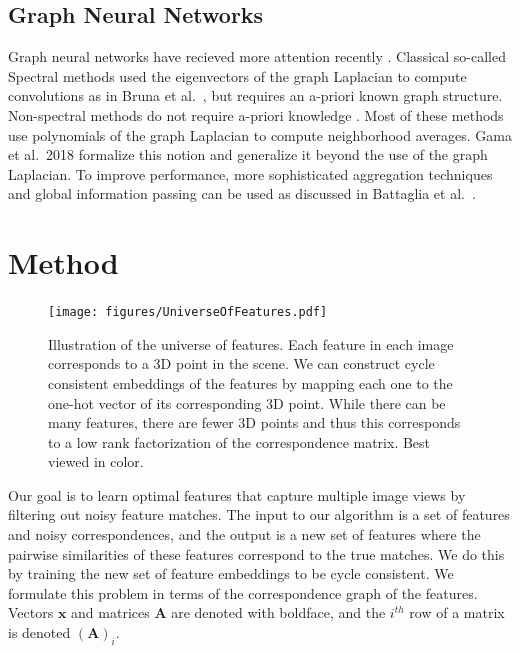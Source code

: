 \documentclass[10pt,twocolumn,letterpaper]{article}
\newcommand{\mat}[1]{\mathbf{#1}}
\begin{document}
\subsection{Graph Neural Networks}
Graph neural networks have recieved more attention recently \cite{bronstein2017geometric, bruna2013spectral, defferrard2016convolutional, kipf2016semi, scarselli2009graph, gama2018mimo, gama2018convolutional, battaglia2018relational}.
Classical so-called Spectral methods used the eigenvectors of the graph Laplacian to compute convolutions as in Bruna et al.~\cite{bruna2013spectral}, but requires an a-priori known graph structure. 
Non-spectral methods do not require a-priori knowledge \cite{bronstein2017geometric, kipf2016semi, scarselli2009graph, gama2018convolutional}.
Most of these methods use polynomials of the graph Laplacian to compute neighborhood averages.
Gama et al.~2018 \cite{gama2018mimo, gama2018convolutional} formalize this notion and generalize it beyond the use of the graph Laplacian.
To improve performance, more sophisticated aggregation techniques and global information passing can be used as discussed in Battaglia et al.~\cite{battaglia2018relational}.

\section{Method}

\begin{figure}[t]
\begin{center}
  \texttt{[image: figures/UniverseOfFeatures.pdf]}
\end{center}
  \caption{
    Illustration of the universe of features.
    Each feature in each image corresponds to a 3D point in the scene.
    We can construct cycle consistent embeddings of the features by mapping each one to the one-hot vector of its corresponding 3D point.
    While there can be many features, there are fewer 3D points and thus this corresponds to a low rank factorization of the correspondence matrix.
    Best viewed in color.
  }
\label{fig:universefeatures}
\label{fig:onecol}
\end{figure}
Our goal is to learn optimal features that capture multiple image views by filtering out noisy feature matches.
The input to our algorithm is a set of features and noisy correspondences, and the output is a new set of features where the pairwise similarities of these features correspond to the true matches.
We do this by training the new set of feature embeddings to be cycle consistent.
We formulate this problem in terms of the correspondence graph of the features.
Vectors $\mat{x}$ and matrices $\mat{A}$ are denoted with boldface, and the $i^{th}$ row of a matrix is denoted $(\mat{A})_i$.
\end{document}
